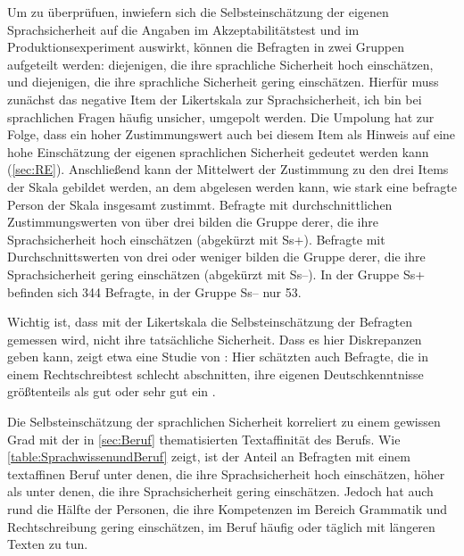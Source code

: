 Um zu überprüfuen, inwiefern sich die Selbsteinschätzung der eigenen Sprachsicherheit auf die Angaben im Akzeptabilitätstest und im Produktionsexperiment auswirkt, können die Befragten in zwei Gruppen aufgeteilt werden: 
diejenigen, die ihre sprachliche Sicherheit hoch einschätzen, und diejenigen, die ihre sprachliche Sicherheit gering einschätzen. 
Hierfür muss zunächst das negative Item der Likertskala zur Sprachsicherheit, \glqq ich bin bei sprachlichen Fragen häufig unsicher\grqq, umgepolt werden. 
Die Umpolung hat zur Folge, dass ein hoher Zustimmungswert auch bei diesem Item als Hinweis auf eine hohe Einschätzung der eigenen sprachlichen Sicherheit gedeutet werden kann (\autoref{sec:RE}). 
Anschließend kann der Mittelwert der Zustimmung zu den drei Items der Skala gebildet werden, an dem abgelesen werden kann, wie stark eine befragte Person der Skala insgesamt zustimmt. 
Befragte mit durchschnittlichen Zustimmungswerten von über drei bilden die Gruppe derer, die ihre Sprachsicherheit hoch einschätzen (abgekürzt mit Ss+). 
Befragte mit Durchschnittswerten von drei oder weniger bilden die Gruppe derer, die ihre Sprachsicherheit gering einschätzen (abgekürzt mit Ss--). 
In der Gruppe Ss+ befinden sich 344 Befragte, in der Gruppe Ss-- nur 53. 

Wichtig ist, dass mit der Likertskala die Selbsteinschätzung der Befragten gemessen wird, nicht ihre tatsächliche Sicherheit. 
Dass es hier Diskrepanzen geben kann, zeigt etwa eine Studie von \citet{Gartig2010}:
Hier schätzten auch Befragte, die in einem Rechtschreibtest schlecht abschnitten, ihre eigenen Deutschkenntnisse größtenteils als gut oder sehr gut ein \citep[s.][12--13]{Gartig2010}. 

Die Selbsteinschätzung der sprachlichen Sicherheit korreliert zu einem gewissen Grad mit der in \autoref{sec:Beruf} thematisierten Textaffinität des Berufs. 
Wie \autoref{table:SprachwissenundBeruf} zeigt, ist der Anteil an Befragten mit einem textaffinen Beruf unter denen, die ihre Sprachsicherheit hoch einschätzen, höher als unter denen, die ihre Sprachsicherheit gering einschätzen. 
Jedoch hat auch rund die Hälfte der Personen, die ihre Kompetenzen im Bereich Grammatik und Rechtschreibung gering einschätzen, im Beruf häufig oder täglich mit längeren Texten zu tun. 

